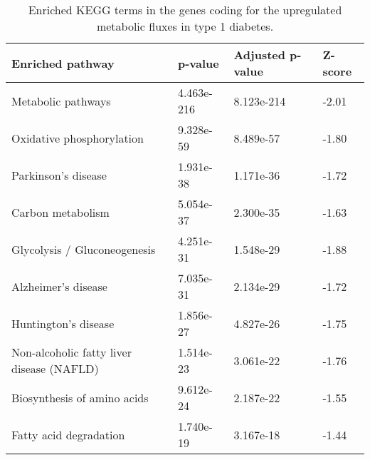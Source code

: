 \clearpage
\begin{table}[h]
\caption[Enriched KEGG terms in type 1 diabetes.]{Enriched KEGG terms in the genes coding for the upregulated metabolic fluxes in type 1 diabetes.}
\begin{center}
	\begin{tabular*}{\textwidth}{l @{\extracolsep{\fill}} lll}
	\hline
	Enriched pathway & p-value  & Adjusted p-value & Z-score        \\ 
	\hline
	Metabolic pathways           & 4.463e-216& 8.123e-214    & -2.01 \\
	Oxidative phosphorylation    & 9.328e-59 & 8.489e-57 & -1.80\\
	Parkinson's disease          & 1.931e-38 & 1.171e-36   &   -1.72 \\
	Carbon metabolism            & 5.054e-37 & 2.300e-35 & -1.63 \\
	Glycolysis / Gluconeogenesis & 4.251e-31 & 1.548e-29      & -1.88     \\
	Alzheimer's disease          & 7.035e-31 & 2.134e-29       & -1.72 \\
	Huntington's disease         & 1.856e-27 & 4.827e-26 & -1.75\\
    Non-alcoholic fatty liver disease (NAFLD) & 1.514e-23       & 3.061e-22    & -1.76  \\
    Biosynthesis of amino acids            & 9.612e-24 & 2.187e-22 & -1.55\\
	Fatty acid degradation                 & 1.740e-19        & 3.167e-18  &  -1.44    \\
	\hline
	\end{tabular*}
\end{center}
\label{GIM:tbls5}%
\end{table}

\clearpage

